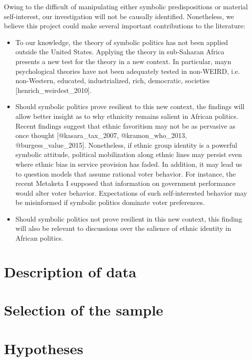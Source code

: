 \documentclass[]{article}
\begin{document}
Owing to the difficult of manipulating either symbolic predispositions
or material self-interest, our investigation will not be causally
identified. Nonetheless, we believe this project could make several
important contributions to the literature:

\begin{itemize}
  \item To our knowledge, the theory of symbolic politics has not been applied outside the United States. Applying the theory in sub-Saharan Africa presents a new test for the theory in a new context. In particular, mayn psychological theories have not been adequately tested in non-WEIRD, i.e. non-Western, educated, industrialized, rich, democratic, societies [henrich_weirdest_2010].
  \item Should symbolic politics prove resilient to this new context, the findings will allow better insight as to why ethnicity remains salient in African politics. Recent findings suggest that ethnic favoritism may not be as pervasive as once thought [@kasara_tax_2007, @kramon_who_2013, @burgess_value_2015]. Nonetheless, if ethnic group identity is a powerful symbolic attitude, political mobilization along ethnic lines may persist even where ethnic bias in service provision has faded. In addition, it may lead us to question models that assume rational voter behavior. For instance, the recent Metaketa I supposed that information on government performance would alter voter behavior. Expectations of such self-interested behavior may be misinformed if symbolic politics dominate voter preferences.
  \item Should symbolic politics not prove resilient in this new context, this finding will also be relevant to discussions over the salience of ethnic identity in African politics.
\end{itemize}

\section{Description of data}\label{description-of-data}

\section{Selection of the sample}\label{selection-of-the-sample}

\section{Hypotheses}\label{hypotheses}
\end{document}
